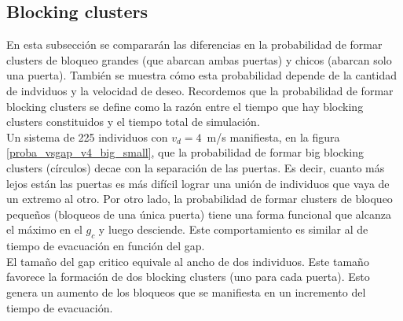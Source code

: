 

\subsection{Blocking clusters}

En esta subsección se compararán las diferencias en la probabilidad de formar clusters de bloqueo grandes (que abarcan ambas puertas) y chicos (abarcan solo una puerta). También se muestra cómo esta probabilidad depende de la cantidad de indviduos y la velocidad de deseo. Recordemos que la probabilidad de formar blocking clusters se define como la razón entre el tiempo que hay blocking clusters constituidos y el tiempo total de simulación. \\
Un sistema de 225 individuos con $v_d=4$~m/s manifiesta, en la figura \ref{proba_vsgap_v4_big_small}, que la probabilidad de formar big blocking clusters (círculos) decae con la separación de las puertas. Es decir, cuanto más lejos están las puertas es más difícil lograr una unión de individuos que vaya de un extremo al otro.
Por otro lado, la probabilidad de formar clusters de bloqueo pequeños (bloqueos de una única puerta) tiene una forma funcional que alcanza el máximo en el $g_c$ y luego desciende. Este comportamiento es similar al de tiempo de evacuación en función del gap.\\
El tamaño del gap critico equivale al ancho de dos individuos. Este tamaño favorece la formación de dos blocking clusters (uno para cada puerta). Esto genera un aumento de los bloqueos que se manifiesta en un incremento del tiempo de evacuación. 


